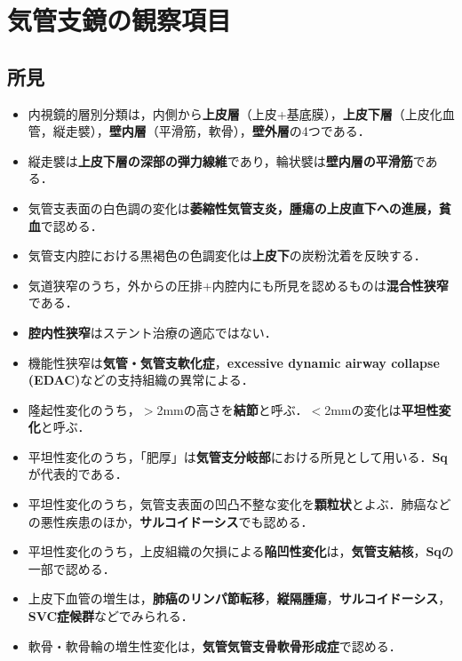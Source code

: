 
\section{気管支鏡の観察項目}
\subsection{所見}
\begin{itemize}

\item 内視鏡的層別分類は，内側から\textbf{上皮層}（上皮+基底膜），\textbf{上皮下層}（上皮化血管，縦走襞），\textbf{壁内層}（平滑筋，軟骨），\textbf{壁外層}の4つである．

\item 縦走襞は\textbf{上皮下層の深部の弾力線維}であり，輪状襞は\textbf{壁内層の平滑筋}である．

\item 気管支表面の白色調の変化は\textbf{萎縮性気管支炎，腫瘍の上皮直下への進展，貧血}で認める．
\item 気管支内腔における黒褐色の色調変化は\textbf{上皮下}の炭粉沈着を反映する．
\item 気道狭窄のうち，外からの圧排+内腔内にも所見を認めるものは\textbf{混合性狭窄}である．
\item \textbf{腔内性狭窄}はステント治療の適応ではない．
\item 機能性狭窄は\textbf{気管・気管支軟化症}，\textbf{excessive dynamic airway collapse (EDAC)}などの支持組織の異常による．

\item 隆起性変化のうち，$>$2mmの高さを\textbf{結節}と呼ぶ．$<$2mmの変化は\textbf{平坦性変化}と呼ぶ．
\item 平坦性変化のうち，「肥厚」は\textbf{気管支分岐部}における所見として用いる．\textbf{Sq}が代表的である．
\item 平坦性変化のうち，気管支表面の凹凸不整な変化を\textbf{顆粒状}とよぶ．肺癌などの悪性疾患のほか，\textbf{サルコイドーシス}でも認める．
\item 平坦性変化のうち，上皮組織の欠損による\textbf{陥凹性変化}は，\textbf{気管支結核}，\textbf{Sq}の一部で認める．

\item 上皮下血管の増生は，\textbf{肺癌のリンパ節転移}，\textbf{縦隔腫瘍}，\textbf{サルコイドーシス}，\textbf{SVC症候群}などでみられる．
\item 軟骨・軟骨輪の増生性変化は，\textbf{気管気管支骨軟骨形成症}で認める．

\end{itemize}
